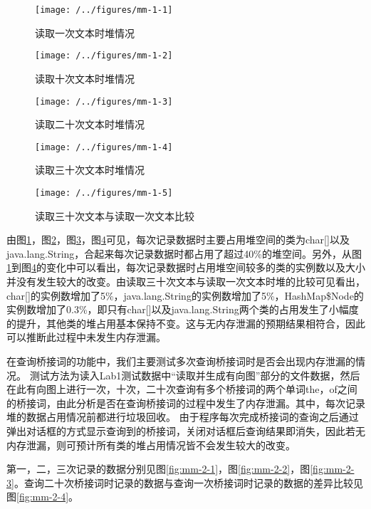\begin{figure}
\centering
\texttt{[image: /../figures/mm-1-1]}
\caption{读取一次文本时堆情况}
\label{fig:mm-1-1}
\end{figure}

\begin{figure}
\centering
\texttt{[image: /../figures/mm-1-2]}
\caption{读取十次文本时堆情况}
\label{fig:mm-1-2}
\end{figure}

\begin{figure}
\centering
\texttt{[image: /../figures/mm-1-3]}
\caption{读取二十次文本时堆情况}
\label{fig:mm-1-3}
\end{figure}

\begin{figure}
\centering
\texttt{[image: /../figures/mm-1-4]}
\caption{读取三十次文本时堆情况}
\label{fig:mm-1-4}
\end{figure}

\begin{figure}
\centering
\texttt{[image: /../figures/mm-1-5]}
\caption{读取三十次文本与读取一次文本比较}
\label{fig:mm-1-5}
\end{figure}

由图\ref{fig:mm-1-1}，图\ref{fig:mm-1-2}，图\ref{fig:mm-1-3}，图\ref{fig:mm-1-4}可见，每次记录数据时主要占用堆空间的类为char[]以及java.lang.String，合起来每次记录数据时都占用了超过40\%的堆空间。另外，从图\ref{fig:mm-1-1}到图\ref{fig:mm-1-4}的变化中可以看出，每次记录数据时占用堆空间较多的类的实例数以及大小并没有发生较大的改变。由读取三十次文本与读取一次文本时堆的比较可见看出，char[]的实例数增加了5\%，java.lang.String的实例数增加了5\%，HashMap\$Node的实例数增加了0.3\%，即只有char[]以及java.lang.String两个类的占用发生了小幅度的提升，其他类的堆占用基本保持不变。这与无内存泄漏的预期结果相符合，因此可以推断此过程中未发生内存泄漏。

在查询桥接词的功能中，我们主要测试多次查询桥接词时是否会出现内存泄漏的情况。
测试方法为读入Lab1测试数据中“读取并生成有向图”部分的文件数据，然后在此有向图上进行一次，十次，二十次查询有多个桥接词的两个单词the，of之间的桥接词，由此分析是否在查询桥接词的过程中发生了内存泄漏。其中，每次记录堆的数据占用情况前都进行垃圾回收。
由于程序每次完成桥接词的查询之后通过弹出对话框的方式显示查询到的桥接词，关闭对话框后查询结果即消失，因此若无内存泄漏，则可预计所有类的堆占用情况皆不会发生较大的改变。

第一，二，三次记录的数据分别见图\ref{fig:mm-2-1}，图\ref{fig:mm-2-2}，图\ref{fig:mm-2-3}。查询二十次桥接词时记录的数据与查询一次桥接词时记录的数据的差异比较见图\ref{fig:mm-2-4}。

